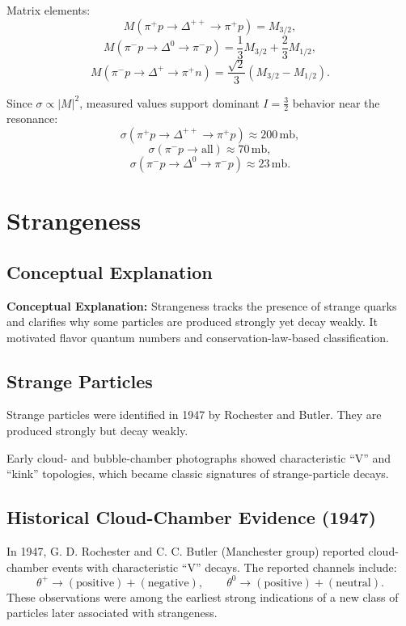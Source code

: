 \documentclass[12pt]{report}
\begin{document}
Matrix elements:
\begin{equation*}
M(\pi^+p\to\Delta^{++}\to\pi^+p)=M_{3/2},
\end{equation*}
\begin{equation*}
M(\pi^-p\to\Delta^0\to\pi^-p)=\frac{1}{3}M_{3/2}+\frac{2}{3}M_{1/2},
\end{equation*}
\begin{equation*}
M(\pi^-p\to\Delta^+\to\pi^+n)=\frac{\sqrt{2}}{3}(M_{3/2}-M_{1/2}).
\end{equation*}

Since $\sigma \propto |M|^2$, measured values support dominant $I=\frac{3}{2}$ behavior near the resonance:
\begin{equation*}
\sigma(\pi^+p\to\Delta^{++}\to\pi^+p) \approx 200\,\text{mb},
\end{equation*}
\begin{equation*}
\sigma(\pi^-p\to\text{all}) \approx 70\,\text{mb},
\end{equation*}
\begin{equation*}
\sigma(\pi^-p\to\Delta^0\to\pi^-p) \approx 23\,\text{mb}.
\end{equation*}

\section{Strangeness}

\subsection{Conceptual Explanation}
\textbf{Conceptual Explanation:} Strangeness tracks the presence of strange quarks and clarifies why some particles are produced strongly yet decay weakly. It motivated flavor quantum numbers and conservation-law-based classification.



\subsection{Strange Particles}
Strange particles were identified in 1947 by Rochester and Butler. They are produced strongly but decay weakly.

Early cloud- and bubble-chamber photographs showed characteristic ``V'' and ``kink'' topologies, which became classic signatures of strange-particle decays.

\subsection{Historical Cloud-Chamber Evidence (1947)}
In 1947, G. D. Rochester and C. C. Butler (Manchester group) reported cloud-chamber events with characteristic ``V'' decays. The reported channels include:
\begin{equation*}
\theta^{+} \to (\text{positive}) + (\text{negative}),\qquad
\theta^{0} \to (\text{positive}) + (\text{neutral}).
\end{equation*}
These observations were among the earliest strong indications of a new class of particles later associated with strangeness.
\end{document}

